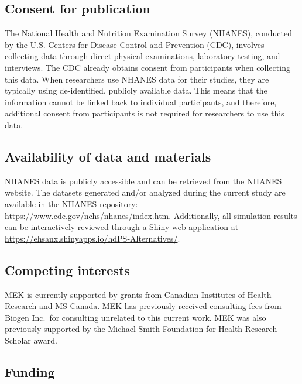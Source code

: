 \documentclass[sn-vancouver,Numbered,lineno,pdflatex]{sn-jnl}
\begin{document}
\subsection*{Consent for publication}\label{consent-for-publication}

The National Health and Nutrition Examination Survey (NHANES), conducted
by the U.S. Centers for Disease Control and Prevention (CDC), involves
collecting data through direct physical examinations, laboratory
testing, and interviews. The CDC already obtains consent from
participants when collecting this data. When researchers use NHANES data
for their studies, they are typically using de-identified, publicly
available data. This means that the information cannot be linked back to
individual participants, and therefore, additional consent from
participants is not required for researchers to use this data.

\subsection*{Availability of data and
materials}\label{availability-of-data-and-materials}

NHANES data is publicly accessible and can be retrieved from the NHANES
website. The datasets generated and/or analyzed during the current study
are available in the NHANES repository:
\url{https://www.cdc.gov/nchs/nhanes/index.htm}. Additionally, all
simulation results can be interactively reviewed through a Shiny web
application at \url{https://ehsanx.shinyapps.io/hdPS-Alternatives/}.

\subsection*{Competing interests}\label{competing-interests}

MEK is currently supported by grants from Canadian Institutes of Health
Research and MS Canada. MEK has previously received consulting fees from
Biogen Inc.~for consulting unrelated to this current work. MEK was also
previously supported by the Michael Smith Foundation for Health Research
Scholar award.

\subsection*{Funding}\label{funding}
\end{document}

